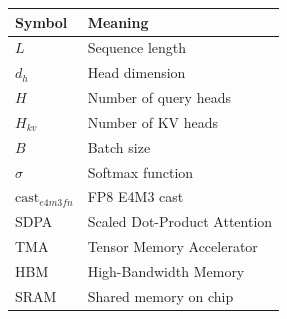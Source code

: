 \begin{table}[H]
\centering
\small
\begin{tabular}{ll}
\toprule
\textbf{Symbol} & \textbf{Meaning} \\
\midrule
$L$ & Sequence length \\
$d_h$ & Head dimension \\
$H$ & Number of query heads \\
$H_{kv}$ & Number of KV heads \\
$B$ & Batch size \\
$\sigma$ & Softmax function \\
$\text{cast}_{e4m3fn}$ & FP8 E4M3 cast \\
SDPA & Scaled Dot-Product Attention \\
TMA & Tensor Memory Accelerator \\
HBM & High-Bandwidth Memory \\
SRAM & Shared memory on chip \\
\bottomrule
\end{tabular}
\end{table}

